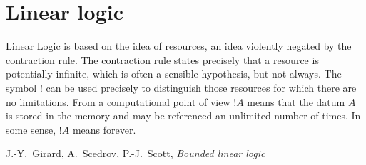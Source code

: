 \documentclass[english,letter paper,12pt,reqno]{article}
\theoremstyle{example}
\numberwithin{equation}{section}
\begin{document}



\section{Linear logic}\label{section:intro_ll}

\setlength{\epigraphwidth}{0.8\textwidth}
\epigraph{Linear Logic is based on the idea of resources, an idea violently negated by the contraction rule. The contraction rule states precisely that a resource is potentially infinite, which is often a sensible hypothesis, but not always. The symbol $!$ can be used precisely to distinguish those resources for which there are no limitations. From a computational point of view $!A$ means that the datum $A$ is stored in the memory and may be referenced an unlimited number of times. In some sense, $!A$ means forever.}
{J.-Y.~Girard, A.~Scedrov, P.-J.~Scott, \textit{Bounded linear logic}}
\end{document}
